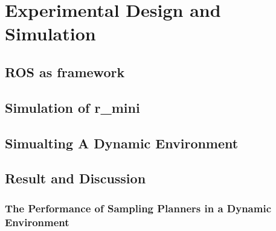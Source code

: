 
\chapter{Experimental Design and Simulation}
\section{ROS as framework}
\section{Simulation of r\_mini}
\section{Simualting A Dynamic Environment}
\section{Result and Discussion}
\subsection{The Performance of Sampling Planners in a Dynamic Environment}


